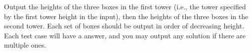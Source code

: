 Output the heights of the three boxes in the first tower 
(i.e., the tower specified by the first tower height in the input), 
then the heights of the three boxes in the second tower.
Each set of boxes should be output in order of decreasing height. 
Each test case will have a answer, and you may output any solution if there are multiple ones.

